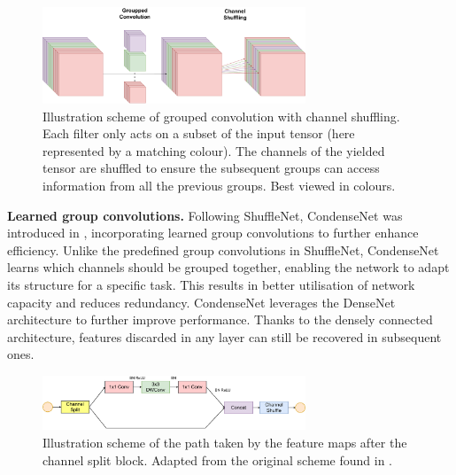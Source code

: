 \begin{figure}[htbp]
  \centering
  \includegraphics[width=0.70\textwidth]{chapter_sota/assets/group_conv_and_channel_shuffling.pdf}
  \caption{Illustration scheme of grouped convolution with channel shuffling.
    Each filter only acts on a subset of the input tensor (here represented by a
    matching colour). The channels of the yielded tensor are shuffled to ensure
    the subsequent groups can access information from all the previous groups.
    Best viewed in colours.}
  \label{fig:sota:shuffle_net}
\end{figure}

\noindent\textbf{Learned group convolutions.} Following ShuffleNet, CondenseNet was
introduced in \cite{huang2018condensenet},
incorporating learned group convolutions to further enhance efficiency. Unlike
the predefined group convolutions in ShuffleNet, CondenseNet learns which
channels should be grouped together, enabling the network to adapt its structure
for a specific task. This results in better utilisation of network capacity and
reduces redundancy. CondenseNet leverages the DenseNet architecture
\cite{huang2017densely} to further improve performance. Thanks to the densely
connected architecture, features discarded in any layer can still be recovered
in subsequent ones.\\

\begin{figure}[htbp]
  \centering
  \includegraphics[width=0.7\textwidth]{chapter_sota/assets/channel_split.pdf}
  \caption{Illustration scheme of the path taken by the feature maps after the
    channel split block. Adapted from the original scheme found in \cite{MaShuffleNetV2}.}
  \label{fig:sota:channel_split}
\end{figure}

